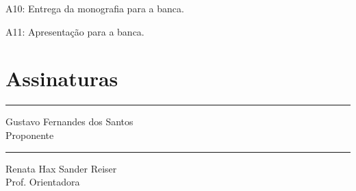 \documentclass[tcc-proposta]{texufpel}
\begin{document}
	A10: Entrega da monografia para a banca.
	
	A11: Apresentação para a banca.
	
	


	
\chapter{Assinaturas}
\vspace{2cm}
	
\begin{center}
\rule{8cm}{.3mm}
\medskip
	
	Gustavo Fernandes dos Santos\\
	Proponente
	
\end{center}
	
\vspace{4cm}
	
\begin{center}
\rule{8cm}{.3mm}
\medskip
	
	Renata Hax Sander Reiser\\
	Prof. Orientadora
	
\end{center}
\end{document}
